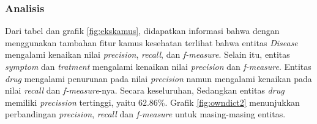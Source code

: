 	\subsubsection{Analisis}

	Dari tabel dan grafik \ref{fig:ekskamus}, didapatkan informasi bahwa dengan menggunakan tambahan fitur kamus kesehatan terlihat bahwa entitas \textit{Disease} mengalami kenaikan nilai \textit{precision}, \textit{recall}, dan \textit{f-measure}. Selain itu, entitas \textit{symptom} dan \textit{tratment} mengalami kenaikan nilai \textit{precision} dan \textit{f-measure}. Entitas \textit{drug} mengalami penurunan pada nilai \textit{precision} namun mengalami kenaikan pada nilai \textit{recall} dan \textit{f-measure}-nya. Secara keseluruhan,  Sedangkan entitas \textit{drug} memiliki \textit{precission} tertinggi, yaitu 62.86\%. Grafik \ref{fig:owndict2} menunjukkan perbandingan \textit{precision}, \textit{recall} dan \textit{f-measure} untuk masing-masing entitas.
	
